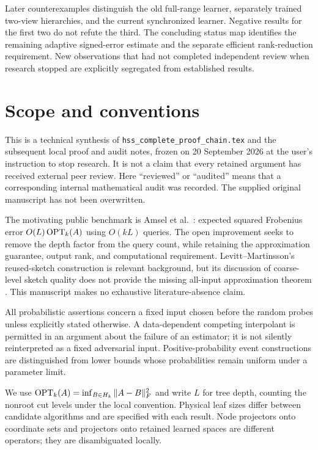 \documentclass[11pt,oneside,openany,a4paper]{report}
\numberwithin{equation}{chapter}
\theoremstyle{definition}
\theoremstyle{remark}
\newcommand{\sourcefile}[1]{{\small\nolinkurl{#1}}}
\begin{document}
Later counterexamples distinguish the old full-range learner, separately trained two-view hierarchies, and the current synchronized learner. Negative results for the first two do not refute the third. The concluding status map identifies the remaining adaptive signed-error estimate and the separate efficient rank-reduction requirement. New observations that had not completed independent review when research stopped are explicitly segregated from established results.

\chapter*{Scope and conventions}
This is a technical synthesis of \sourcefile{hss_complete_proof_chain.tex} and the subsequent local proof and audit notes, frozen on 20 September 2026 at the user's instruction to stop research. It is not a claim that every retained argument has received external peer review. Here ``reviewed'' or ``audited'' means that a corresponding internal mathematical audit was recorded. The supplied original manuscript has not been overwritten.

The motivating public benchmark is Amsel et al.\ \cite{amsel2025}: expected squared Frobenius error $O(L)\operatorname{OPT}_k(A)$ using $O(kL)$ queries. The open improvement seeks to remove the depth factor from the query count, while retaining the approximation guarantee, output rank, and computational requirement. Levitt--Martinsson's reused-sketch construction is relevant background, but its discussion of coarse-level sketch quality does not provide the missing all-input approximation theorem \cite{levitt2024}. This manuscript makes no exhaustive literature-absence claim.

All probabilistic assertions concern a fixed input chosen before the random probes unless explicitly stated otherwise. A data-dependent competing interpolant is permitted in an argument about the failure of an estimator; it is not silently reinterpreted as a fixed adversarial input. Positive-probability event constructions are distinguished from lower bounds whose probabilities remain uniform under a parameter limit.

We use $\operatorname{OPT}_k(A)=\inf_{B\in H_k}\|A-B\|_F^2$ and write $L$ for tree depth, counting the nonroot cut levels under the local convention. Physical leaf sizes differ between candidate algorithms and are specified with each result. Node projectors onto coordinate sets and projectors onto retained learned spaces are different operators; they are disambiguated locally.
\end{document}
